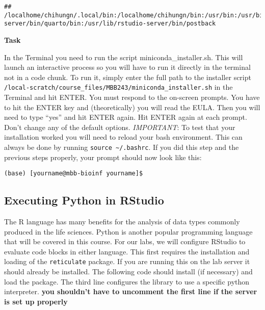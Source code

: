 \documentclass[
]{article}
\newenvironment{Shaded}{\begin{snugshade}}{\end{snugshade}}
\newcommand{\BuiltInTok}[1]{#1}
\newcommand{\VariableTok}[1]{\textcolor[rgb]{0.00,0.00,0.00}{#1}}
\begin{document}
\begin{Shaded}
\end{Shaded}

\begin{verbatim}
## /localhome/chihungn/.local/bin:/localhome/chihungn/bin:/usr/bin:/usr/bin:/usr/local/sbin:/usr/local/bin:/usr/sbin:/usr/lib/rstudio-server/bin/quarto/bin:/usr/lib/rstudio-server/bin/postback
\end{verbatim}

\textbf{Task}

In the Terminal you need to run the script miniconda\_installer.sh. This
will launch an interactive process so you will have to run it directly
in the terminal not in a code chunk. To run it, simply enter the full
path to the installer script
\texttt{/local-scratch/course\_files/MBB243/miniconda\_installer.sh} in
the Terminal and hit ENTER. You must respond to the on-screen prompts.
You have to hit the ENTER key and (theoretically) you will read the
EULA. Then you will need to type ``yes'' and hit ENTER again. Hit ENTER
again at each prompt. Don't change any of the default options.
\emph{IMPORTANT}: To test that your installation worked you will need to
reload your bash environment. This can always be done by running
\texttt{source\ \textasciitilde{}/.bashrc}. If you did this step and the
previous steps properly, your prompt should now look like this:

\texttt{(base)\ {[}yourname@mbb-bioinf\ yourname{]}\$}

\hypertarget{executing-python-in-rstudio}{%
\subsection{Executing Python in
RStudio}\label{executing-python-in-rstudio}}

The R language has many benefits for the analysis of data types commonly
produced in the life sciences. Python is another popular programming
language that will be covered in this course. For our labs, we will
configure RStudio to evaluate code blocks in either language. This first
requires the installation and loading of the \texttt{reticulate}
package. If you are running this on the lab server it should already be
installed. The following code should install (if necessary) and load the
package. The third line configures the library to use a specific python
interpreter. \textbf{you shouldn't have to uncomment the first line if
the server is set up properly}
\end{document}
